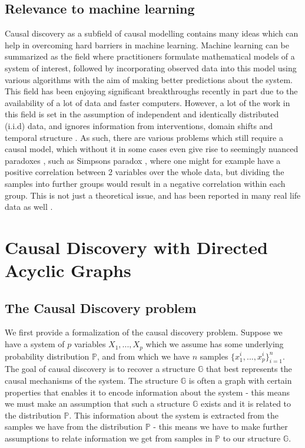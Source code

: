 \documentclass{tufte-book}
\begin{document}
\section{Relevance to machine learning}
\label{sec:orgd1c3a65}
Causal discovery as a subfield of causal modelling contains many ideas which can help in overcoming hard barriers in machine learning. Machine learning can be summarized as the field where practitioners formulate mathematical models of a system of interest, followed by incorporating observed data into this model using various algorithms with the aim of making better predictions about the system. This field has been enjoying significant breakthroughs recently in part due to the availability of a lot of data and faster computers. However, a lot of the work in this field is set in the assumption of independent and identically distributed (i.i.d) data, and ignores information from interventions, domain shifts and temporal structure \cite{schoelkopf-2019-causal-machin-learn}. As such, there are various problems which still require a causal model, which without it in some cases even give rise to seemingly nuanced paradoxes \cite{pearl-2018-book-why}, such as Simpsons paradox \cite{simpson-1951-inter-inter}, where one might for example have a positive correlation between 2 variables over the whole data, but dividing the samples into further groups would result in a negative correlation within each group.  This is not just a theoretical issue, and has been reported in many real life data as well \cite{wagner-1982-simps-parad}.


\chapter{Causal Discovery with Directed Acyclic Graphs}
\label{sec:org6631e88}
\section{The Causal Discovery problem}
\label{sec:org64fb7c1}
We first provide a formalization of the causal discovery problem. Suppose we have a system of \(p\) variables \(X_1,...,X_p\) which we assume has some underlying probability distribution \(\mathbb{P}\), and from which we have \(n\) samples \(\{x_1^i,...,x_p^i\}_{i=1}^n\). The goal of causal discovery is to recover a structure \(\mathbb{G}\) that best represents the causal mechanisms of the system. The structure \(\mathbb{G}\) is often a graph with certain properties that enables it to encode information about the system - this means we must make an assumption that such a structure \(\mathbb{G}\) exists and it is related to the distribution \(\mathbb{P}\). This information about the system is extracted from the samples we have from the distribution \(\mathbb{P}\) - this means we have to make further assumptions to relate information we get from samples in \(\mathbb{P}\) to our structure \(\mathbb{G}\).
\end{document}
